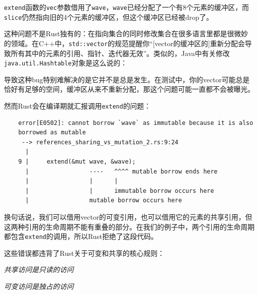 \texttt{extend}函数的\texttt{vec}参数借用了\texttt{wave}，\texttt{wave}已经分配了一个有8个元素的缓冲区，而\texttt{slice}仍然指向旧的4个元素的缓冲区，但这个缓冲区已经被drop了。

这种问题不是Rust独有的：在指向集合的同时修改集合在很多语言里都是很微妙的领域。在C++中，\texttt{std::vector}的规范提醒你“[vector的缓冲区的]重新分配会导致所有其中的元素的引用、指针、迭代器无效”。类似的，Java中有关修改\texttt{java.util.Hashtable}对象是这么说的：


导致这种bug特别难解决的是它并不是总是发生。在测试中，你的vector可能总是恰好有足够的空间，缓冲区从来不重新分配，那这个问题可能一直都不会被曝光。

然而Rust会在编译期就汇报调用\texttt{extend}的问题：
\begin{verbatim}
    error[E0502]: cannot borrow `wave` as immutable because it is also
    borrowed as mutable
     --> references_sharing_vs_mutation_2.rs:9:24
      |
    9 |     extend(&mut wave, &wave);
      |                 ----   ^^^^ mutable borrow ends here
      |                 |      |
      |                 |      immutable borrow occurs here
      |                 mutable borrow occurs here
\end{verbatim}

换句话说，我们可以借用vector的可变引用，也可以借用它的元素的共享引用，但这两种引用的生命周期不能有重叠的部分。在我们的例子中，两个引用的生命周期都包含\texttt{extend}的调用，所以Rust拒绝了这段代码。

这些错误都违背了Rust关于可变和共享的核心规则：

\begin{flushleft}
    \emph{共享访问是只读的访问}
\end{flushleft}


\begin{flushleft}
    \emph{可变访问是独占的访问}
\end{flushleft}


